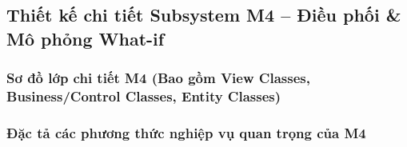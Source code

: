 \subsection{Thiết kế chi tiết Subsystem M4 – Điều phối \& Mô phỏng What-if}

\subsubsection{Sơ đồ lớp chi tiết M4 (Bao gồm View Classes, Business/Control Classes, Entity Classes)}


\subsubsection{Đặc tả các phương thức nghiệp vụ quan trọng của M4}

